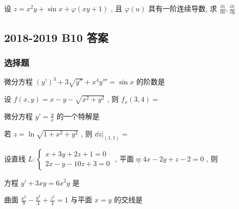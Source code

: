 \begin{ti}
	设 $z=x^2y+\sin x+\varphi(xy+1)$ , 且 $\varphi(u)$ 具有一阶连续导数, 求 $\frac{\partial z}{\partial x},\frac{\partial z}{\partial y}$
\end{ti}


\subsection{2018-2019 B10 答案}
\subsubsection{选择题}
\begin{ti}
	微分方程 $(y')^3+3\sqrt{y''}+x^4y'''=\sin x$ 的阶数是\kuoD
\end{ti}

\begin{ti}
	设 $f(x,y)=x-y-\sqrt{x^2+y^2}$ , 则 $f_{x}(3,4)=$\kuoB
\end{ti}

\begin{ti}
	微分方程 $y'=\frac{y}{x}$ 的一个特解是\kuoA
\end{ti}

\begin{ti}
	若 $z=\ln\sqrt{1+x^2+y^2}$ , 则 $\left.\dd{z}\right|_{(1,1)}=$\kuoA
\end{ti}

\begin{ti}
	设直线 $L:\begin{cases}
	x+3y+2z+1=0\\
	2x-y-10z+3=0
	\end{cases}$ , 平面 $\eta:4x-2y+z-2=0$ , 则\kuoC
\end{ti}

\begin{ti}
	方程 $y'+3xy=6x^2y$ 是\kuoD
\end{ti}

\begin{ti}
	曲面 $\frac{x^2}{9}-\frac{y^2}{4}+\frac{z^2}{4}=1$ 与平面 $x=y$ 的交线是\kuoB
\end{ti}

